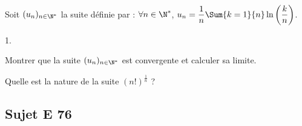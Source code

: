 \documentclass[11pt]{article}%
\begin{document}

\begin{exerciceSP}~\\
  Soit $(u_n)_{n\in\N^*}$ la suite définie par : $\forall n\in\N^*$,
  $u_n=\dfrac{1}{n}\Sum{k=1}{n} \ln\left(\dfrac{k}{n}\right)$.
  \begin{noliste}{1.}
    \setlength{\itemsep}{2mm}
  \item Montrer que la suite $(u_n)_{n\in\N^*}$ est convergente et
    calculer sa limite.
  \item Quelle est la nature de la suite $(n!)^{\frac{1}{n}}$ ?
  \end{noliste}
\end{exerciceSP}



\subsection*{Sujet E 76}

\end{document}
